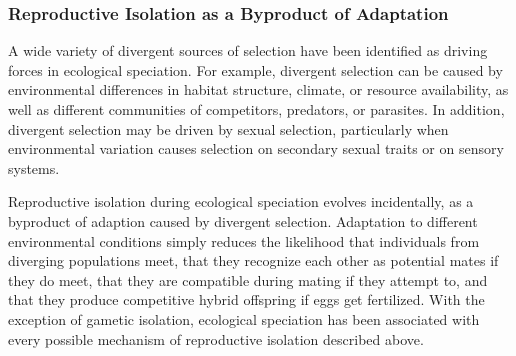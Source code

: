 \documentclass[
]{book}
\begin{document}
\hypertarget{reproductive-isolation-as-a-byproduct-of-adaptation}{%
\subsubsection*{Reproductive Isolation as a Byproduct of Adaptation}\label{reproductive-isolation-as-a-byproduct-of-adaptation}}

A wide variety of divergent sources of selection have been identified as driving forces in ecological speciation. For example, divergent selection can be caused by environmental differences in habitat structure, climate, or resource availability, as well as different communities of competitors, predators, or parasites. In addition, divergent selection may be driven by sexual selection, particularly when environmental variation causes selection on secondary sexual traits or on sensory systems.

Reproductive isolation during ecological speciation evolves incidentally, as a byproduct of adaption caused by divergent selection. Adaptation to different environmental conditions simply reduces the likelihood that individuals from diverging populations meet, that they recognize each other as potential mates if they do meet, that they are compatible during mating if they attempt to, and that they produce competitive hybrid offspring if eggs get fertilized. With the exception of gametic isolation, ecological speciation has been associated with every possible mechanism of reproductive isolation described above.
\end{document}
